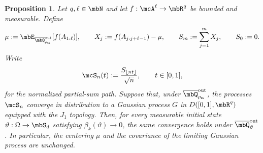 \documentclass[a4paper]{article}
\numberwithin{equation}{section}   %
\theoremstyle{plain}   %
\theoremstyle{plain}   %
\newtheorem{prop}[lemma]{Proposition}   %
\theoremstyle{examplestyle}
\DeclareMathOperator{\states}{\mbS_d}   %
\newcommand{\s}{\rho_{\mathsf{ss}}}     %
\begin{document}
\begin{prop}
\label{univ:prop:transfer}
    Let $q,\ell\in\mbN$ and let $f:\mcA^\ell\to\mbR^q$ be bounded and measurable.
    Define
    \[
        \mu:=\mbE_{\overline\mbQ^{\mathrm{out}}_{\s}}[f(A_{1:\ell})],
        \qquad
        X_j:=f(A_{j:j+\ell-1})-\mu,
        \qquad
        S_m:=\sum_{j=1}^{m}X_j,
        \qquad S_0:=0.
    \]
    Write
    \[
        \mcS_n(t)
        :=\frac{S_{\lfloor nt\rfloor}}{\sqrt n},
        \qquad t\in[0,1],
    \]
    for the normalized partial-sum path.
    Suppose that, under $\overline\mbQ^{\mathrm{out}}_{\s}$, the processes $\mcS_n$ converge in distribution to a Gaussian process $G$ in $D([0,1],\mbR^q)$ equipped with the $J_1$ topology.
    Then, for every measurable initial state $\vartheta:\Omega\to\states$ satisfying $\beta_k(\vartheta)\to0$, the same convergence holds under $\overline\mbQ^{\mathrm{out}}_\vartheta$.
    In particular, the centering $\mu$ and the covariance of the limiting Gaussian process are unchanged.
\end{prop}
\end{document}
